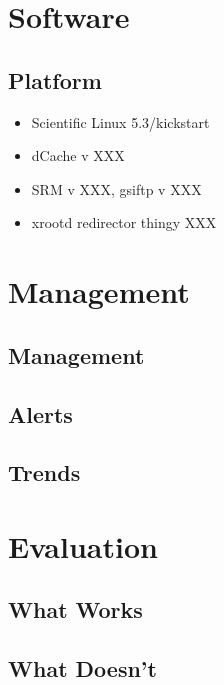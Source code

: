 \documentclass{beamer}
\begin{document}
\section{Software}
\subsection{Platform}
\begin{frame}
\begin{itemize}
	\item Scientific Linux 5.3/kickstart
	\item dCache v XXX
	\item SRM v XXX, gsiftp v XXX
	\item xrootd redirector thingy XXX
\end{itemize}
\end{frame}

\section{Management}
\subsection{Management} %
\begin{frame}
	\item 
\end{frame}

\subsection{Alerts} %
\begin{frame}
\end{frame}

\subsection{Trends} %
\begin{frame}
\end{frame}

\section{Evaluation}
\subsection{What Works}
\subsection{What Doesn't}
\end{document}
